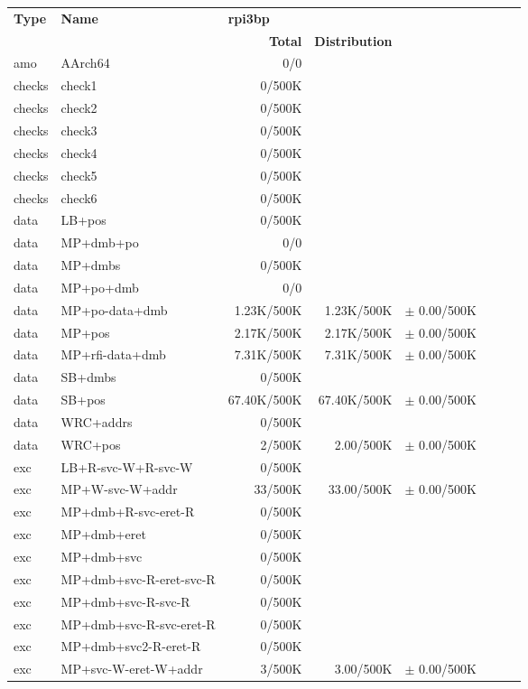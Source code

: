 \begin{tabular}{l l  | r r l | r r l}
\textbf{Type} & \textbf{Name} & \multicolumn{3}{l}{\textbf{rpi3bp}} \\
& & \textbf{Total} & \textbf{Distribution} &  \\
   amo&AArch64&0/0&&&\\
\hline
   checks&check1&0/500K&&&\\
\hline
   checks&check2&0/500K&&&\\
\hline
   checks&check3&0/500K&&&\\
\hline
   checks&check4&0/500K&&&\\
\hline
   checks&check5&0/500K&&&\\
\hline
   checks&check6&0/500K&&&\\
\hline
   data&LB+pos&0/500K&&&\\
\hline
   data&MP+dmb+po&0/0&&&\\
\hline
   data&MP+dmbs&0/500K&&&\\
\hline
   data&MP+po+dmb&0/0&&&\\
\hline
   data&MP+po-data+dmb&1.23K/500K&1.23K/500K&$\pm$ 0.00/500K&\\
\hline
   data&MP+pos&2.17K/500K&2.17K/500K&$\pm$ 0.00/500K&\\
\hline
   data&MP+rfi-data+dmb&7.31K/500K&7.31K/500K&$\pm$ 0.00/500K&\\
\hline
   data&SB+dmbs&0/500K&&&\\
\hline
   data&SB+pos&67.40K/500K&67.40K/500K&$\pm$ 0.00/500K&\\
\hline
   data&WRC+addrs&0/500K&&&\\
\hline
   data&WRC+pos&2/500K&2.00/500K&$\pm$ 0.00/500K&\\
\hline
   exc&LB+R-svc-W+R-svc-W&0/500K&&&\\
\hline
   exc&MP+W-svc-W+addr&33/500K&33.00/500K&$\pm$ 0.00/500K&\\
\hline
   exc&MP+dmb+R-svc-eret-R&0/500K&&&\\
\hline
   exc&MP+dmb+eret&0/500K&&&\\
\hline
   exc&MP+dmb+svc&0/500K&&&\\
\hline
   exc&MP+dmb+svc-R-eret-svc-R&0/500K&&&\\
\hline
   exc&MP+dmb+svc-R-svc-R&0/500K&&&\\
\hline
   exc&MP+dmb+svc-R-svc-eret-R&0/500K&&&\\
\hline
   exc&MP+dmb+svc2-R-eret-R&0/500K&&&\\
\hline
   exc&MP+svc-W-eret-W+addr&3/500K&3.00/500K&$\pm$ 0.00/500K&\\

\end{tabular}
